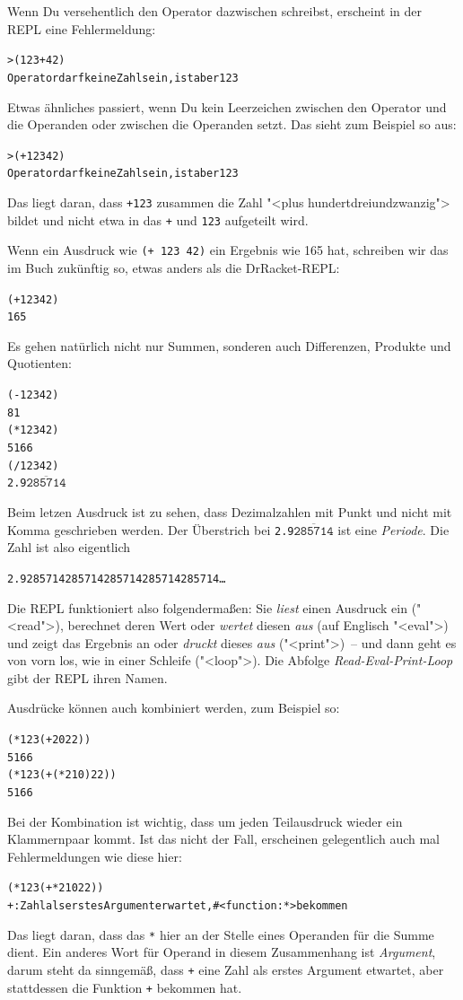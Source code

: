 Wenn Du versehentlich den Operator dazwischen schreibst, erscheint
in der REPL eine Fehlermeldung:
%
\begin{alltt}
> ({\color{green}123} + {\color{green}42})
{\color{red}Operator darf keine Zahl sein, ist aber 123}
\end{alltt}
%
Etwas ähnliches passiert, wenn Du kein Leerzeichen zwischen den
Operator und die Operanden oder zwischen die Operanden setzt.  Das
sieht zum Beispiel so aus:
%
\begin{alltt}
> ({\color{green}+123} {\color{green}42})
{\color{red}Operator darf keine Zahl sein, ist aber 123}
\end{alltt}
%
Das liegt daran, dass \texttt{+123} zusammen die Zahl "<plus
hundertdreiundzwanzig"> bildet und nicht etwa in das \texttt{+} und
\texttt{123} aufgeteilt wird.

Wenn ein Ausdruck wie \texttt{(+ 123 42)} ein Ergebnis wie 165 hat,
schreiben wir das im Buch zukünftig so, etwas anders als die
DrRacket-REPL:
%
\begin{alltt}
(+ 123 42)
\evalsto{} 165
\end{alltt}
%
Es gehen natürlich nicht nur Summen, sonderen auch Differenzen,
Produkte und Quotienten:
%
\begin{alltt}
(- 123 42)
\evalsto{} 81
(* 123 42)
\evalsto{} 5166
(/ 123 42)
\evalsto{} 2.9\(\overline{\mathtt{285714}}\)
\end{alltt}
%
Beim letzen Ausdruck ist zu sehen, dass Dezimalzahlen mit Punkt und
nicht mit Komma geschrieben werden.  Der Überstrich bei
\texttt{2.9\(\overline{\mathtt{285714}}\)} ist eine
\textit{Periode}. Die Zahl ist also eigentlich
%
\begin{alltt}
2.9285714285714285714285714285714\ldots
\end{alltt}
%
Die REPL funktioniert also folgendermaßen: Sie \emph{liest} einen
Ausdruck ein ("<read">), berechnet deren Wert oder \emph{wertet}
diesen \emph{aus} (auf Englisch "<eval">) und zeigt das Ergebnis an
oder \emph{druckt} dieses \emph{aus} ("<print">)~-- und dann geht es
von vorn los, wie in einer Schleife ("<loop">).  Die Abfolge
\emph{Read-Eval-Print-Loop} gibt der REPL ihren Namen.

Ausdrücke können auch kombiniert werden, zum Beispiel so:
%
\begin{alltt}
(* 123 (+ 20 22))
\evalsto{} 5166
(* 123 (+ (* 2 10) 22))
\evalsto{} 5166
\end{alltt}
%
Bei der Kombination ist wichtig, dass um jeden Teilausdruck wieder ein
Klammernpaar kommt.  Ist das nicht der Fall, erscheinen gelegentlich
auch mal Fehlermeldungen wie diese hier:
%
\begin{alltt}
(* 123 (+ * 2 10 22))
{\color{red}+: Zahl als erstes Argument erwartet, #<function:*> bekommen}
\end{alltt}
%
Das liegt daran, dass das \texttt{*} hier an der Stelle eines
Operanden für die Summe dient.  Ein anderes Wort für Operand in diesem
Zusammenhang ist \textit{Argument}, darum steht da sinngemäß, dass
\texttt{+} eine Zahl als erstes Argument etwartet, aber
stattdessen die Funktion \texttt{+} bekommen hat.

